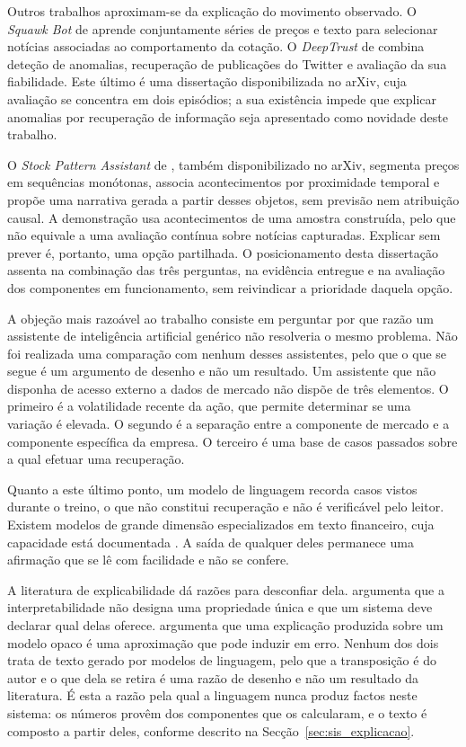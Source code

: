 Outros trabalhos aproximam-se da explicação do movimento observado. O \emph{Squawk Bot} de
\textcite{dang2020squawk} aprende conjuntamente séries de preços e texto para selecionar notícias
associadas ao comportamento da cotação. O \emph{DeepTrust} de \textcite{chan2022deeptrust}
combina deteção de anomalias, recuperação de publicações do Twitter e avaliação da sua
fiabilidade. Este último é uma dissertação disponibilizada no arXiv, cuja avaliação se concentra
em dois episódios; a sua existência impede que explicar anomalias por recuperação de informação
seja apresentado como novidade deste trabalho.

O \emph{Stock Pattern Assistant} de \textcite{neela2025spa}, também disponibilizado no arXiv,
segmenta preços em sequências monótonas, associa acontecimentos por proximidade temporal e propõe
uma narrativa gerada a partir desses objetos, sem previsão nem atribuição causal. A demonstração
usa acontecimentos de uma amostra construída, pelo que não equivale a uma avaliação contínua
sobre notícias capturadas. Explicar sem prever é, portanto, uma opção partilhada. O posicionamento
desta dissertação assenta na combinação das três perguntas, na evidência entregue e na avaliação
dos componentes em funcionamento, sem reivindicar a prioridade daquela opção.

A objeção mais razoável ao trabalho consiste em perguntar por que razão um assistente de
inteligência artificial genérico não resolveria o mesmo problema. Não foi realizada uma comparação
com nenhum desses assistentes, pelo que o que se segue é um argumento de desenho e não um resultado.
Um assistente que não disponha de acesso externo a dados de mercado não dispõe de três elementos.
O primeiro é a volatilidade recente da ação, que permite determinar se uma variação é elevada. O
segundo é a separação entre a componente de mercado e a componente específica da empresa. O
terceiro é uma base de casos passados sobre a qual efetuar uma recuperação.

Quanto a este último ponto, um modelo de linguagem recorda
casos vistos durante o treino, o que não constitui recuperação e não é verificável pelo leitor.
Existem modelos de grande dimensão especializados em texto financeiro, cuja capacidade está
documentada \autocite{li2023llmfinance}. A saída de qualquer deles permanece uma afirmação que se lê com facilidade e não se confere.

A
literatura de explicabilidade dá razões para desconfiar dela. \textcite{lipton2018mythos}
argumenta que a interpretabilidade não designa uma propriedade única e que um sistema deve
declarar qual delas oferece. \textcite{rudin2019stop} argumenta que uma explicação produzida sobre
um modelo opaco é uma aproximação que pode induzir em erro. Nenhum dos dois trata de texto gerado por modelos de linguagem, pelo que a transposição é do
autor e o que dela se retira é uma razão de desenho e não um resultado da literatura. É esta a razão pela qual a linguagem nunca produz
factos neste sistema: os números provêm dos componentes que os calcularam, e o texto é composto a
partir deles, conforme descrito na Secção~\ref{sec:sis_explicacao}.

